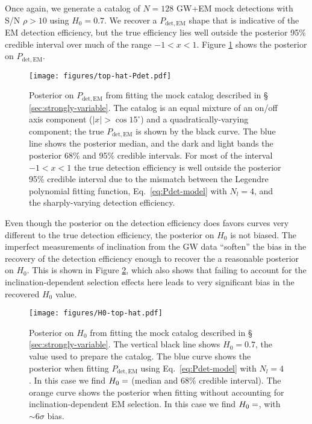\documentclass[modern]{aastex631}
\newcommand{\detected}{\mathrm{det}}
\newcommand{\EM}{\mathrm{EM}}
\begin{document}
Once again, we generate a catalog of $N = 128$ GW+EM mock detections with S/N
$\rho > 10$ using $H_0 = 0.7$.  We recover a $P_{\detected,\EM}$ shape that is
indicative of the EM detection efficiency, but the true efficiency lies well
outside the posterior 95\% credible interval over much of the range $-1 < x <
1$.  Figure \ref{fig:top-hat-Pdet} shows the posterior on $P_{\detected,\EM}$.

\begin{figure}
    \texttt{[image: figures/top-hat-Pdet.pdf]}
    \caption{Posterior on $P_{\detected,\EM}$ from fitting the mock catalog
    described in \S\, \ref{sec:strongly-variable}.  The catalog is an equal
    mixture of an on/off axis component ($|x| > \cos 15^\circ$) and a
    quadratically-varying component; the true $P_{\detected,\EM}$ is shown by
    the black curve.  The blue line shows the posterior median, and the dark and
    light bands the posterior 68\% and 95\% credible intervals.  For most of the
    interval $-1 < x < 1$ the true detection efficiency is well outside the
    posterior 95\% credible interval due to the mismatch between the Legendre
    polynomial fitting function, Eq.\ \eqref{eq:Pdet-model} with $N_l = 4$, and
    the sharply-varying detection efficiency.}
    \label{fig:top-hat-Pdet}
\end{figure}

Even though the posterior on the detection efficiency does favors curves very
different to the true detection efficiency, the posterior on $H_0$ is not
biased.  The imperfect measurements of inclination from the GW data ``soften''
the bias in the recovery of the detection efficiency enough to recover the a
reasonable posterior on $H_0$.  This is shown in Figure \ref{fig:H0-top-hat},
which also shows that failing to account for the inclination-dependent selection
effects here leads to very significant bias in the recovered $H_0$ value.

\begin{figure}
    \texttt{[image: figures/H0-top-hat.pdf]}
    \caption{Posterior on $H_0$ from fitting the mock catalog described in \S\,
    \ref{sec:strongly-variable}.  The vertical black line shows $H_0 = 0.7$, the
    value used to prepare the catalog.  The blue curve shows the posterior when
    fitting $P_{\detected,\EM}$ using Eq.\ \eqref{eq:Pdet-model} with $N_l=4$.
    In this case we find $H_0 = \variable{output/H0-top-hat.txt}$ (median and
    68\% credible interval).  The orange curve shows the posterior when fitting
    without accounting for inclination-dependent EM selection.  In this case we
    find $H_0 = \variable{output/H0-top-hat-flat.txt}$, with $\sim 6 \sigma$
    bias.}
    \label{fig:H0-top-hat}
\end{figure}
\end{document}
